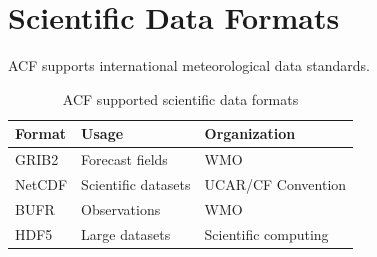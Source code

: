 \section{Scientific Data Formats}


ACF supports international meteorological data standards.



\begin{table}[h]

\centering

\begin{tabular}{lll}

\toprule

Format & Usage & Organization \\

\midrule

GRIB2 & Forecast fields & WMO \\

NetCDF & Scientific datasets & UCAR/CF Convention \\

BUFR & Observations & WMO \\

HDF5 & Large datasets & Scientific computing \\

\bottomrule

\end{tabular}


\caption{ACF supported scientific data formats}

\end{table}
